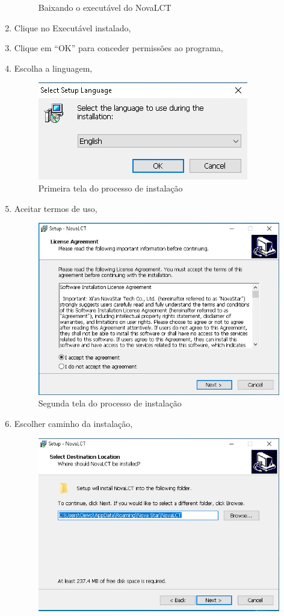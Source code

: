 \documentclass[12pt, a4paper]{article}
\begin{document}
\begin{enumerate}
\begin{figure}[!htb]
			\caption{\label{fig:NOVALCT_INSTALL}Baixando o executável do NovaLCT}
		\end{figure}
		\newpage
	\item Clique no Executável instalado,
	\item Clique em ``OK'' para conceder permissões ao programa,
	\item Escolha a linguagem,
		\begin{figure}[!htb]
			\centering
			\includegraphics[width=\textwidth]{D1.jpeg}
			\caption{\label{fig:D1.jpeg}Primeira tela do processo de instalação}
		\end{figure}
		\newpage
	\item Aceitar termos de uso,
		\begin{figure}[!htb]
			\centering
			\includegraphics[width=.8\textwidth]{D2.jpeg}
			\caption{\label{fig:D2.jpeg}Segunda tela do processo de instalação}
		\end{figure}
	\item Escolher caminho da instalação,
		\begin{figure}[!htb]
			\centering
			\includegraphics[width=.8\textwidth]{D3.jpeg}

\end{figure}
\end{enumerate}
\end{document}
